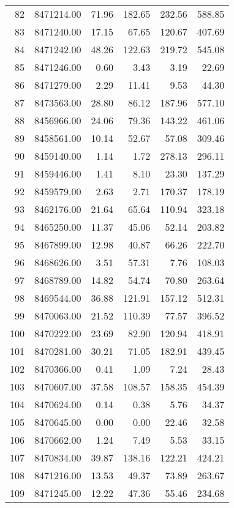 \begin{table}[ht]
\begin{tabular}{rrrrrr}
  82 & 8471214.00 & 71.96 & 182.65 & 232.56 & 588.85 \\ 
  83 & 8471240.00 & 17.15 & 67.65 & 120.67 & 407.69 \\ 
  84 & 8471242.00 & 48.26 & 122.63 & 219.72 & 545.08 \\ 
  85 & 8471246.00 & 0.60 & 3.43 & 3.19 & 22.69 \\ 
  86 & 8471279.00 & 2.29 & 11.41 & 9.53 & 44.30 \\ 
  87 & 8473563.00 & 28.80 & 86.12 & 187.96 & 577.10 \\ 
  88 & 8456966.00 & 24.06 & 79.36 & 143.22 & 461.06 \\ 
  89 & 8458561.00 & 10.14 & 52.67 & 57.08 & 309.46 \\ 
  90 & 8459140.00 & 1.14 & 1.72 & 278.13 & 296.11 \\ 
  91 & 8459446.00 & 1.41 & 8.10 & 23.30 & 137.29 \\ 
  92 & 8459579.00 & 2.63 & 2.71 & 170.37 & 178.19 \\ 
  93 & 8462176.00 & 21.64 & 65.64 & 110.94 & 323.18 \\ 
  94 & 8465250.00 & 11.37 & 45.06 & 52.14 & 203.82 \\ 
  95 & 8467899.00 & 12.98 & 40.87 & 66.26 & 222.70 \\ 
  96 & 8468626.00 & 3.51 & 57.31 & 7.76 & 108.03 \\ 
  97 & 8468789.00 & 14.82 & 54.74 & 70.80 & 263.64 \\ 
  98 & 8469544.00 & 36.88 & 121.91 & 157.12 & 512.31 \\ 
  99 & 8470063.00 & 21.52 & 110.39 & 77.57 & 396.52 \\ 
  100 & 8470222.00 & 23.69 & 82.90 & 120.94 & 418.91 \\ 
  101 & 8470281.00 & 30.21 & 71.05 & 182.91 & 439.45 \\ 
  102 & 8470366.00 & 0.41 & 1.09 & 7.24 & 28.43 \\ 
  103 & 8470607.00 & 37.58 & 108.57 & 158.35 & 454.39 \\ 
  104 & 8470624.00 & 0.14 & 0.38 & 5.76 & 34.37 \\ 
  105 & 8470645.00 & 0.00 & 0.00 & 22.46 & 32.58 \\ 
  106 & 8470662.00 & 1.24 & 7.49 & 5.53 & 33.15 \\ 
  107 & 8470834.00 & 39.87 & 138.16 & 122.21 & 424.21 \\ 
  108 & 8471216.00 & 13.53 & 49.37 & 73.89 & 263.67 \\ 
  109 & 8471245.00 & 12.22 & 47.36 & 55.46 & 234.68 \\ 

\end{tabular}
\end{table}
